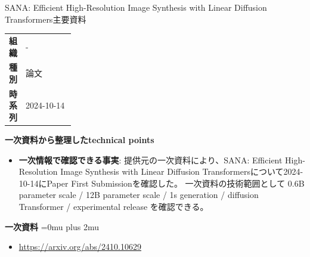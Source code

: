 \begin{technicalnote}{SANA: Efficient High-Resolution Image Synthesis with Linear Diffusion Transformers}{主要資料}
\begingroup
\begin{tabularx}{\linewidth}{@{}>{\bfseries}p{0.22\linewidth}X@{}}
組織 & - \\
種別 & 論文 \\
時系列 & 2024-10-14 \\
\end{tabularx}
\smallskip
{\bfseries 一次資料から整理したtechnical points}
\begin{itemize}[leftmargin=1.5em,itemsep=0.35em]
\item \textbf{一次情報で確認できる事実}: 提供元の一次資料により、SANA: Efficient High-Resolution Image Synthesis with Linear Diffusion Transformersについて2024-10-14にPaper First Submissionを確認した。 一次資料の技術範囲として 0.6B parameter scale / 12B parameter scale / 1s generation / diffusion Transformer / experimental release を確認できる。
\end{itemize}
\begin{minipage}{\linewidth}
\begin{samepage}
{\bfseries 一次資料}
\begingroup\sloppy
\Urlmuskip=0mu plus 2mu\relax
\begin{itemize}[leftmargin=1.5em,itemsep=0.25em]
\item {\scriptsize\url{https://arxiv.org/abs/2410.10629}}
\end{itemize}
\endgroup
\end{samepage}
\end{minipage}
\endgroup
\end{technicalnote}
\medskip


